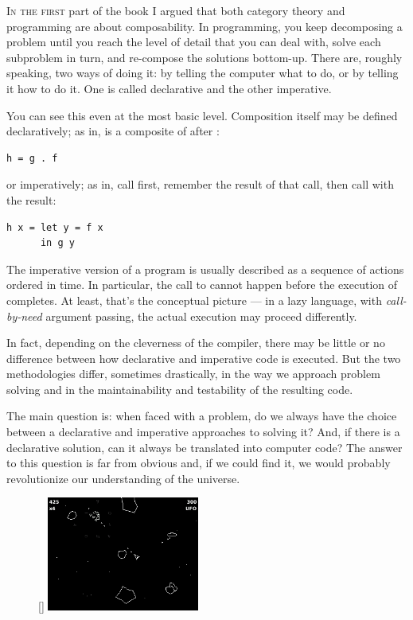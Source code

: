 \lettrine[lhang=0.17]{I}{n the first} part of the book I argued that both category theory and
programming are about composability. In programming, you keep
decomposing a problem until you reach the level of detail that you can
deal with, solve each subproblem in turn, and re-compose the solutions
bottom-up. There are, roughly speaking, two ways of doing it: by telling
the computer what to do, or by telling it how to do it. One is called
declarative and the other imperative.

You can see this even at the most basic level. Composition itself may be
defined declaratively; as in,  is a composite of 
after :

\begin{verbatim}
h = g . f
\end{verbatim}
or imperatively; as in, call  first, remember the result of
that call, then call  with the result:

\begin{verbatim}
h x = let y = f x 
      in g y
\end{verbatim}
The imperative version of a program is usually described as a sequence
of actions ordered in time. In particular, the call to  cannot
happen before the execution of  completes. At least, that's
the conceptual picture --- in a lazy language, with \emph{call-by-need}
argument passing, the actual execution may proceed differently.

In fact, depending on the cleverness of the compiler, there may be
little or no difference between how declarative and imperative code is
executed. But the two methodologies differ, sometimes drastically, in
the way we approach problem solving and in the maintainability and
testability of the resulting code.

The main question is: when faced with a problem, do we always have the
choice between a declarative and imperative approaches to solving it?
And, if there is a declarative solution, can it always be translated
into computer code? The answer to this question is far from obvious and,
if we could find it, we would probably revolutionize our understanding
of the universe.

\begin{figure}
\raisebox{0pt}[\dimexpr{}\baselineskip\relax]{
\includegraphics[width=50mm]{images/asteroids.png}}
\end{figure}

